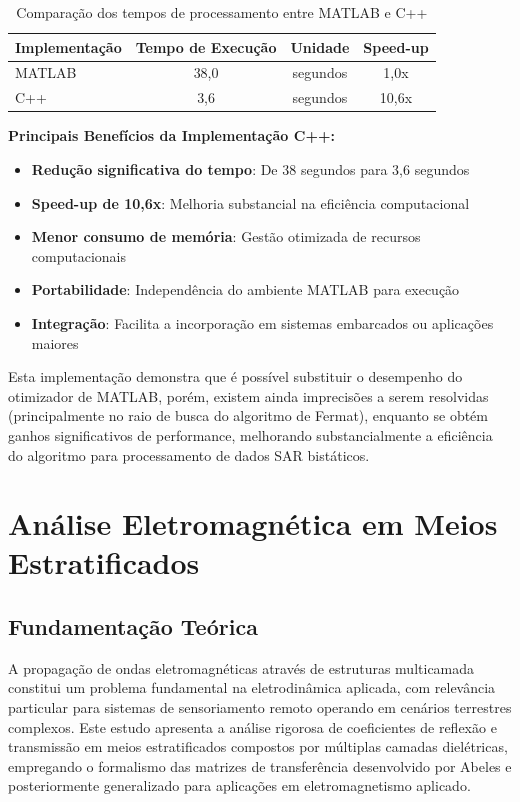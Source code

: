 \documentclass[11pt,a4paper]{article}
\begin{document}
\begin{table}[H]
\centering
\caption{Comparação dos tempos de processamento entre MATLAB e C++}
\label{tab:comparacao_tempos}
\begin{tabular}{|l|c|c|c|}
\hline
\textbf{Implementação} & \textbf{Tempo de Execução} & \textbf{Unidade} & \textbf{Speed-up} \\
\hline
MATLAB & 38,0 & segundos & 1,0x \\
\hline
C++ & 3,6 & segundos & 10,6x \\
\hline
\end{tabular}
\end{table}

\textbf{Principais Benefícios da Implementação C++:}

\begin{itemize}
\item \textbf{Redução significativa do tempo}: De 38 segundos para 3,6 segundos
\item \textbf{Speed-up de 10,6x}: Melhoria substancial na eficiência computacional
\item \textbf{Menor consumo de memória}: Gestão otimizada de recursos computacionais
\item \textbf{Portabilidade}: Independência do ambiente MATLAB para execução
\item \textbf{Integração}: Facilita a incorporação em sistemas embarcados ou aplicações maiores
\end{itemize}

Esta implementação demonstra que é possível substituir o desempenho do otimizador de MATLAB, porém, existem ainda imprecisões a serem resolvidas (principalmente no raio de busca do algoritmo de Fermat), enquanto se obtém ganhos significativos de performance, melhorando substancialmente a eficiência do algoritmo para processamento de dados SAR bistáticos.

\section{Análise Eletromagnética em Meios Estratificados}

\subsection{Fundamentação Teórica}

A propagação de ondas eletromagnéticas através de estruturas multicamada constitui um problema fundamental na eletrodinâmica aplicada, com relevância particular para sistemas de sensoriamento remoto operando em cenários terrestres complexos. Este estudo apresenta a análise rigorosa de coeficientes de reflexão e transmissão em meios estratificados compostos por múltiplas camadas dielétricas, empregando o formalismo das matrizes de transferência desenvolvido por Abeles e posteriormente generalizado para aplicações em eletromagnetismo aplicado.
\end{document}
